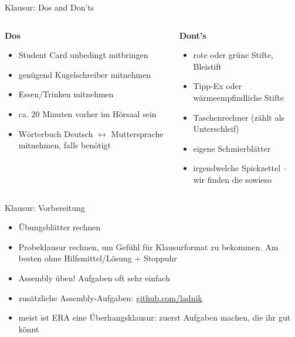 \documentclass[
  german,            %
  aspectratio=169,    %
]{tumbeamer}
\newcommand{\cmark}{\ding{51}}%
\newcommand{\xmark}{\ding{55}}%
\begin{document}
\begin{frame}[c]{Klausur: Dos and Don'ts}{}
	\begin{columns}[c]
		\begin{column}{0.5\textwidth}
			\centering \textbf{Dos} \textcolor{green}{\cmark}
			\vspace{\baselineskip}
			\begin{itemize}
				\item Student Card unbedingt mitbringen
				\item genügend Kugelschreiber mitnehmen
				\item Essen/Trinken mitnehmen
				\item ca. 20 Minuten vorher im Hörsaal sein
				\item Wörterbuch Deutsch $\leftrightarrow$ Muttersprache mitnehmen, falls benötigt
			\end{itemize}
		\end{column}
		\begin{column}{0.5\textwidth}
			\centering \textbf{Dont's} \textcolor{red}{\xmark}
			\vspace{\baselineskip}
			\begin{itemize}
				\item rote oder grüne Stifte, Bleistift
				\item Tipp-Ex oder wärmeempfindliche Stifte
				\item Taschenrechner (zählt als Unterschleif)
				\item eigene Schmierblätter
				\item irgendwelche Spickzettel -- wir finden die sowieso
			\end{itemize}
		\end{column}
	\end{columns}
\end{frame}

\begin{frame}[c]{Klausur: Vorbereitung}{}
	\begin{itemize}
		\item Übungsblätter rechnen
		\item Probeklausur rechnen, um Gefühl für Klausurformat zu bekommen. Am besten ohne Hilfsmittel/Lösung + Stoppuhr
		\item Assembly üben! Aufgaben oft sehr einfach
		\item zusätzliche Assembly-Aufgaben: \href{https://github.com/ladnik/RISC-V-Assembly-Introductory-Exercises}{github.com/ladnik}
		\item meist ist ERA eine Überhangsklausur: zuerst Aufgaben machen, die ihr gut könnt
	\end{itemize}
\end{frame}
\end{document}
